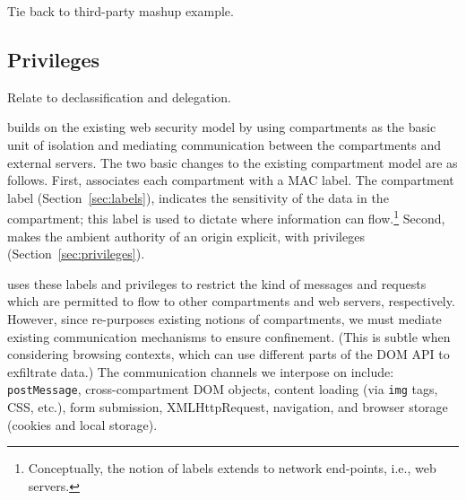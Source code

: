 Tie back to third-party mashup example.

\subsection{Privileges}
\label{sec:system:privileges}
Relate to declassification and delegation.



\sys{} builds on the existing web security model by using compartments
as the basic unit of isolation and mediating communication between 
the compartments and external servers.
%
%
The two basic changes to the existing compartment model are as follows.
%
First, \sys{} associates each compartment with a MAC label.
%
The compartment label (Section~\ref{sec:labels}), indicates the
sensitivity of the data in the compartment; this label is used to
dictate where information can flow.\footnote{Conceptually, the notion
of labels extends to network end-points, i.e., web servers.}
%
%
%
Second, \sys{} makes the ambient authority of an origin explicit, with
privileges (Section~\ref{sec:privileges}).
 
\sys{} uses these labels and privileges to restrict the
kind of messages and requests which are permitted to flow to other
compartments and web servers, respectively.
%
However, since \sys{} re-purposes existing notions of compartments, we
must mediate existing communication mechanisms to ensure confinement.
%
(This is subtle when considering browsing contexts, which can use
different parts of the DOM API to exfiltrate data.)
%
The communication channels we interpose on include:
%
{\tt postMessage},
cross-compartment DOM objects,
content loading (via {\tt img} tags, CSS, etc.),
form submission,
XMLHttpRequest,
navigation, and
browser storage (cookies and local storage).

